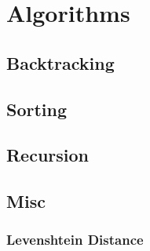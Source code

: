 \section{Algorithms}

\subsection{Backtracking}

\subsection{Sorting}

\subsection{Recursion}

\subsection{Misc}

\subsubsection{Levenshtein Distance}

